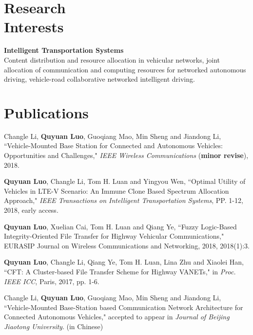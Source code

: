 \documentclass[margin,line]{resume}
\begin{document}
\begin{resume}
    \section{\mysidestyle Research\\Interests}

    \textbf{Intelligent Transportation Systems}
    \vspace{0.5mm}
    \\
    Content distribution and resource allocation in vehicular networks, joint allocation of communication and computing resources for networked autonomous driving, vehicle-road collaborative networked intelligent driving.
    \vspace{-0mm}
    \section{\mysidestyle Publications}
   \begin{list2}
    \item Changle Li, \textbf{Quyuan Luo}, Guoqiang Mao, Min Sheng and Jiandong Li, ``Vehicle-Mounted Base Station for Connected and Autonomous Vehicles: Opportunities and Challenges," \emph{IEEE Wireless Communications} (\textbf{minor revise}), 2018.

  \item \textbf{Quyuan Luo}, Changle Li, Tom H. Luan and Yingyou Wen, ``Optimal Utility of Vehicles in LTE-V Scenario: An Immune Clone Based Spectrum Allocation Approach," \emph{IEEE Transactions on Intelligent Transportation Systems}, PP. 1-12, 2018, early access.

  \item   \textbf{Quyuan Luo}, Xuelian Cai, Tom H. Luan and Qiang Ye, ``Fuzzy Logic-Based Integrity-Oriented File Transfer for Highway Vehicular Communications," EURASIP Journal on Wireless Communications and Networking, 2018, 2018(1):3.

  \item \textbf{Quyuan Luo}, Changle Li, Qiang Ye, Tom H. Luan, Lina Zhu and Xiaolei Han, ``CFT: A Cluster-based File Transfer Scheme for Highway VANETs," in \emph{Proc. IEEE ICC}, Paris, 2017, pp. 1-6.

  \item Changle Li, \textbf{Quyuan Luo}, Guoqiang Mao, Min Sheng and Jiandong Li, ``Vehicle-Mounted Base-Station based Communication Network Architecture for Connected Autonomous Vehicles," accepted to appear in \emph{Journal of Beijing Jiaotong University}. (in Chinese)


\end{list2}
\end{resume}
\end{document}
